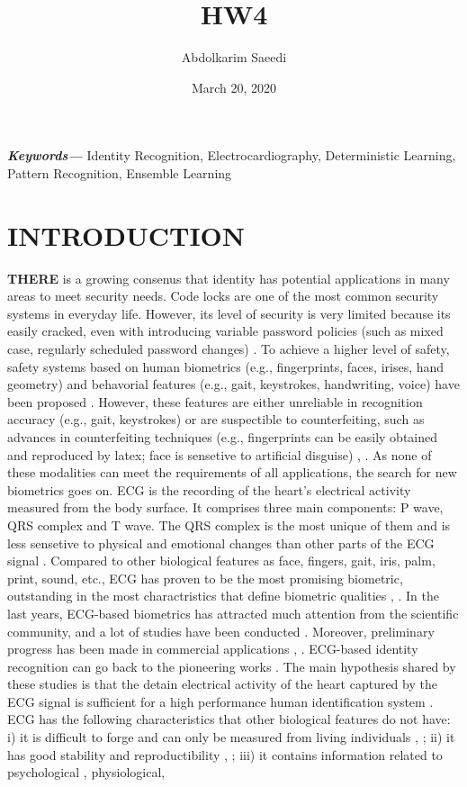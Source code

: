 \documentclass[onecolumn,12pt]{article}
\providecommand{\keywords}[1]{\textbf{\textit{Keywords---}} #1}
\begin{document}
\title{ HW4 }
\author{Abdolkarim Saeedi}
\date{March 20, 2020}
\maketitle
{}
\newpage
\keywords{Identity Recognition, Electrocardiography, Deterministic Learning, Pattern Recognition, Ensemble Learning}
\section{\large \color{blue}INTRODUCTION}
\textbf{{\LARGE T}HERE} is a growing consenus that identity has potential applications in many areas to meet security needs. Code locks are one of the most common security systems in everyday life. However, its level of security is very limited because its easily cracked, even with introducing variable password policies (such as mixed case, regularly scheduled password changes) \cite{citation1}. To achieve a higher level of safety, safety systems based on human biometrics (e.g., fingerprints, faces, irises, hand geometry) and behavorial features (e.g., gait, keystrokes, handwriting, voice) have been proposed \cite{citation2}. However, these features are either unreliable in recognition accuracy (e.g., gait, keystrokes) or are suspectible to counterfeiting, such as advances in counterfeiting techniques (e.g., fingerprints can be easily obtained and reproduced by latex; face is sensetive to artificial disguise) \cite{citation3}, \cite{citation4}. As none of these modalities can meet the requirements of all applications, the search for new biometrics goes on. ECG is the recording of the heart's electrical activity measured from the body surface. It comprises three main components: P wave, QRS complex and T wave. The QRS complex is the most unique of them and is less sensetive to physical and emotional changes than other parts of the ECG signal \cite{citation3}. Compared to other biological features as face, fingers, gait, iris, palm, print, sound, etc., ECG has proven to be the most promising biometric, outstanding in the most charactristics that define biometric qualities \cite{citation5}, \cite{citation6}. In the last years, ECG-based biometrics has attracted much attention from the scientific community, and a lot of studies have been conducted \cite{citation7, citation8, citation9, citation10, citation11, citation12}. Moreover, preliminary progress has been made in commercial applications \cite{citation13}, \cite{citation14}. ECG-based identity recognition can go back to the pioneering works \cite{citation15, citation16, citation17}. The main hypothesis shared by these studies is that the detain electrical activity of the heart captured by the ECG signal is sufficient for a high performance human identification system \cite{citation18}. ECG has the following characteristics that other biological features do not have: i) it is difficult to forge and can only be measured from living individuals \cite{citation18}, \cite{citation19}; ii) it has good stability and reproductibility \cite{citation15}, \cite{citation20}; iii) it contains information related to psychological , physiological, 
\end{document}
